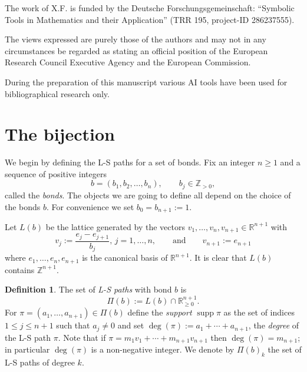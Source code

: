 \documentclass[12pt, a4paper]{amsart}   	%
\numberwithin{equation}{section}
\theoremstyle{plain}
\theoremstyle{definition}
\newtheorem{definition}[theorem]{Definition}
\DeclareMathOperator{\supp}{supp}
\newcommand{\ZZ}{\mathbb{Z}}
\newcommand{\RR}{\mathbb{R}}
\begin{document}
\vskip 10pt

 The work of X.F. is funded by the Deutsche Forschungsgemeinschaft: “Symbolic Tools in Mathematics and their Application” (TRR 195, project-ID 286237555). 

\smallskip
{} The views expressed are purely those of the authors and may not in any circumstances be regarded as stating an official position of the European Research Council Executive Agency and the European Commission.
\smallskip

 During the preparation of this manuscript various AI tools have been used for bibliographical research only.


\section{The bijection}\label{Sec:2}

We begin by defining the L-S paths for a set of bonds. Fix an integer $n\ge 1$ and a sequence of positive integers
\[
b = (b_1, b_2, \dots, b_n), \qquad b_j \in \ZZ_{>0},
\]
called the \emph{bonds}. The objects we are going to define all depend on the choice of the bonds $b$. For convenience we set $b_0 = b_{n+1} := 1$.
 
Let $L(b)$ be the lattice generated by the vectors $v_1,\dots,v_n, v_{n+1} \in \RR^{n+1}$ with
\[
v_j := \frac{e_j - e_{j+1}}{b_j}, \, j = 1,\ldots,n,\qquad\textrm{and}\qquad v_{n+1} := e_{n+1}
\]
where $e_1,\dots,e_n,e_{n+1}$ is the canonical basis of $\RR^{n+1}$. It is clear that $L(b)$ contains $\ZZ^{n+1}$.

\begin{definition}
The set of \emph{L-S paths}  with bond $b$ is
\[
\Pi(b) := L(b) \cap \RR^{n+1}_{\ge 0}.
\]
For $\pi = (a_1,\dots,a_{n+1})\in \Pi(b)$ define the \emph{support} $\supp\pi$ as the set of indices $1\leq j\leq n+1$ such that $a_j\neq 0$ and set $\deg(\pi) := a_1 + \cdots + a_{n+1} $, the \emph{degree} of the L-S path $\pi$. Note that if $\pi = m_1v_1 + \cdots + m_{n+1}v_{n+1}$ then $\deg(\pi) = m_{n+1}$; in particular $\deg(\pi)$ is a non-negative integer. We denote by $\Pi(b)_k$ the set of L-S paths of degree $k$.
\end{definition}
\end{document}
